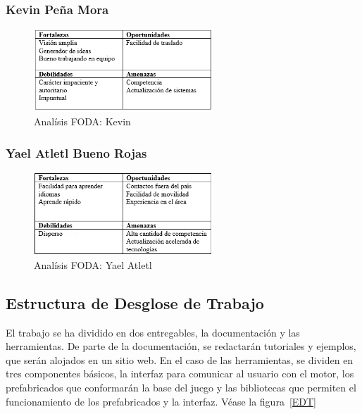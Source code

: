 \documentclass[]{article}
\begin{document}
\subsubsection{Kevin Pe\~na Mora}
\begin{figure}[H]
	
	\centering
	\includegraphics[width=0.6\textwidth]{kevin}
	\caption{Anal\'isis FODA: Kevin}
	
\end{figure}

\subsubsection{Yael Atletl Bueno Rojas}

\begin{figure}[H]
	
	\centering
	\includegraphics[width=0.6\textwidth]{yael}
	\caption{Anal\'isis FODA: Yael Atletl}
	
\end{figure}

\subsection{Estructura de Desglose de Trabajo}

El trabajo se ha dividido en dos entregables, la documentaci\'on y las herramientas. De parte de la documentaci\'on, se redactar\'an tutoriales y ejemplos, que ser\'an alojados en un sitio web. \newline
En el caso de las herramientas, se dividen en tres componentes b\'asicos, la interfaz para comunicar al usuario con el motor, los prefabricados que conformar\'an la base del juego y las bibliotecas que permiten el funcionamiento de los prefabricados y la interfaz. V\'ease la figura~\ref{EDT}
\end{document}
